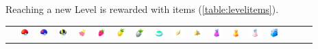 Reaching a new Level is rewarded with items (\autoref{table:levelitems}).
\begin{table}[t]
  \begin{center}
  \setlength{\tabcolsep}{1pt}
  \footnotesize
  \begin{tabular}{r|g c g c g c g c g c g c g c g c g}
  &
  \includegraphics[width=1em]{images/pokeball.png} &
  \includegraphics[width=1em]{images/greatball.png} &
  \includegraphics[width=1em]{images/ultraball.png} &
  \includegraphics[width=1em]{images/nanab.png} &
  \includegraphics[width=1em]{images/razz.png} &
  \includegraphics[width=1em]{images/pinap.png} &
  \includegraphics[width=1em]{images/silverpinap.png} &
  \includegraphics[width=1em]{images/incense.png} &
  \includegraphics[width=1em]{images/revive.png} &
  \includegraphics[width=1em]{images/maxrevive.png} &
  \includegraphics[width=1em]{images/Potion.png} &
  \includegraphics[width=1em]{images/Super_Potion.png} &
  \includegraphics[width=1em]{images/Hyper_Potion.png} &
  \includegraphics[width=1em]{images/Max_Potion.png} &

\end{tabular}
\end{center}
\end{table}
